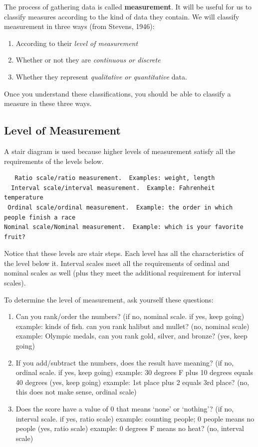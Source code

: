 \documentclass[
]{book}
\providecommand{\tightlist}{%
  \setlength{\itemsep}{0pt}\setlength{\parskip}{0pt}}
\begin{document}
The process of gathering data is called \textbf{measurement}. It will be useful for us to classify measures according to the kind of data they contain. We will classify measurement in three ways (from Stevens, 1946):

\begin{enumerate}
\def\labelenumi{\arabic{enumi}.}
\tightlist
\item
  According to their \emph{level of measurement}
\item
  Whether or not they are \emph{continuous or discrete}
\item
  Whether they represent \emph{qualitative or quantitative} data.
\end{enumerate}

Once you understand these classifications, you should be able to classify a measure in these three ways.

\hypertarget{level-of-measurement}{%
\subsection{Level of Measurement}\label{level-of-measurement}}

A stair diagram is used because higher levels of measurement satisfy all the requirements of the levels below.

\begin{verbatim}
   Ratio scale/ratio measurement.  Examples: weight, length         
  Interval scale/interval measurement.  Example: Fahrenheit temperature     
 Ordinal scale/ordinal measurement.  Example: the order in which people finish a race 
Nominal scale/Nominal measurement.  Example: which is your favorite fruit?
\end{verbatim}

Notice that these levels are stair steps. Each level has all the characteristics of the level below it. Interval scales meet all the requirements of ordinal and nominal scales as well (plus they meet the additional requirement for interval scales).

To determine the level of measurement, ask yourself these questions:

\begin{enumerate}
\def\labelenumi{\arabic{enumi}.}
\tightlist
\item
  Can you rank/order the numbers? (if no, nominal scale. if yes, keep going) example: kinds of fish. can you rank halibut and mullet? (no, nominal scale) example: Olympic medals, can you rank gold, silver, and bronze? (yes, keep going)
\item
  If you add/subtract the numbers, does the result have meaning? (if no, ordinal scale. if yes, keep going) example: 30 degrees F plus 10 degrees equals 40 degrees (yes, keep going) example: 1st place plus 2 equals 3rd place? (no, this does not make sense, ordinal scale)
\item
  Does the score have a value of 0 that means `none' or `nothing'? (if no, interval scale. if yes, ratio scale) example: counting people; 0 people means no people (yes, ratio scale) example: 0 degrees F means no heat? (no, interval scale)
\end{enumerate}
\end{document}
